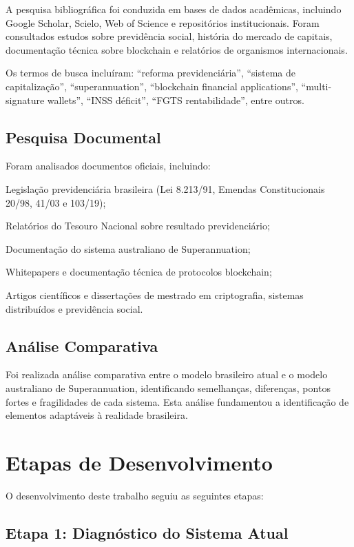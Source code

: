 A pesquisa bibliográfica foi conduzida em bases de dados acadêmicas, incluindo Google Scholar, Scielo, Web of Science e repositórios institucionais. Foram consultados estudos sobre previdência social, história do mercado de capitais, documentação técnica sobre blockchain e relatórios de organismos internacionais.

Os termos de busca incluíram: ``reforma previdenciária'', ``sistema de capitalização'', ``superannuation'', ``blockchain financial applications'', ``multi-signature wallets'', ``INSS déficit'', ``FGTS rentabilidade'', entre outros.

\subsection{Pesquisa Documental}

Foram analisados documentos oficiais, incluindo:
\begin{alineas}
    \item Legislação previdenciária brasileira (Lei 8.213/91, Emendas Constitucionais 20/98, 41/03 e 103/19);
    \item Relatórios do Tesouro Nacional sobre resultado previdenciário;
    \item Documentação do sistema australiano de Superannuation;
    \item Whitepapers e documentação técnica de protocolos blockchain;
    \item Artigos científicos e dissertações de mestrado em criptografia, sistemas distribuídos e previdência social.
\end{alineas}

\subsection{Análise Comparativa}

Foi realizada análise comparativa entre o modelo brasileiro atual e o modelo australiano de Superannuation, identificando semelhanças, diferenças, pontos fortes e fragilidades de cada sistema. Esta análise fundamentou a identificação de elementos adaptáveis à realidade brasileira.

\section{Etapas de Desenvolvimento}

O desenvolvimento deste trabalho seguiu as seguintes etapas:

\subsection{Etapa 1: Diagnóstico do Sistema Atual}

